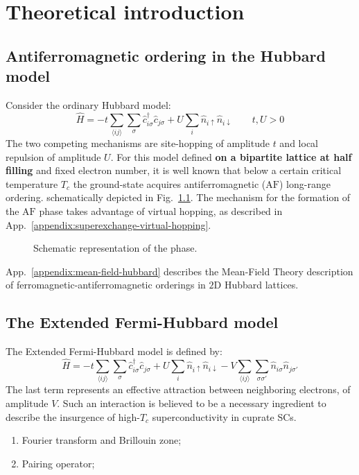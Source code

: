 \chapter{Theoretical introduction}\label{chapter:theoretical-introduction}

\todo

\section{Antiferromagnetic ordering in the Hubbard model}

Consider the ordinary Hubbard model:
\begin{equation}\label{eq:hubbard-model}
	\hat H = 
	-t \sum_{\langle ij \rangle} \sum_\sigma \hat c_{i\sigma}^\dagger \hat c_{j\sigma}
	+ U \sum_i \hat n_{i\uparrow} \hat n_{i\downarrow}
	\qquad
	t, U  > 0
\end{equation}
The two competing mechanisms are site-hopping of amplitude $t$ and local repulsion of amplitude $U$. For this model defined \textbf{on a bipartite lattice at half filling} and fixed electron number, it is well known \mref{} that below a certain critical temperature $T_c$ the ground-state acquires antiferromagnetic ($\mathrm{AF}$) long-range ordering. schematically depicted in Fig.~\ref{fig:antiferromagnet}. The mechanism for the formation of the $\mathrm{AF}$ phase takes advantage of virtual hopping, as described in App.~\ref{appendix:superexchange-virtual-hopping}.

\begin{figure}
	\centering
	
	\caption{Schematic representation of the \AF phase.}
	\label{fig:antiferromagnet}
\end{figure}

App.~\ref{appendix:mean-field-hubbard} describes the Mean-Field Theory description of ferromagnetic-antiferromagnetic orderings in $2\mathrm{D}$ Hubbard lattices.

\section{The Extended Fermi-Hubbard model}

The Extended Fermi-Hubbard model is defined by:
\begin{equation}\label{eq:extended-hubbard-model}
	\hat H = 
	-t \sum_{\langle ij \rangle} \sum_\sigma \hat c_{i\sigma}^\dagger \hat c_{j\sigma}
	+ U \sum_i \hat n_{i\uparrow} \hat n_{i\downarrow}
	- V \sum_{\langle ij \rangle} \sum_{\sigma \sigma'} \hat n_{i\sigma} \hat n_{j\sigma'}
\end{equation}
The last term represents an effective attraction between neighboring electrons, of amplitude $V$. Such an interaction is believed \cite{cao2025p-wave} to be a necessary ingredient to describe the insurgence of high-$T_c$ superconductivity in cuprate SCs. \todo

{\color{tabred}
\begin{enumerate}
	\item Fourier transform and Brillouin zone;
	\item Pairing operator;
\end{enumerate}}